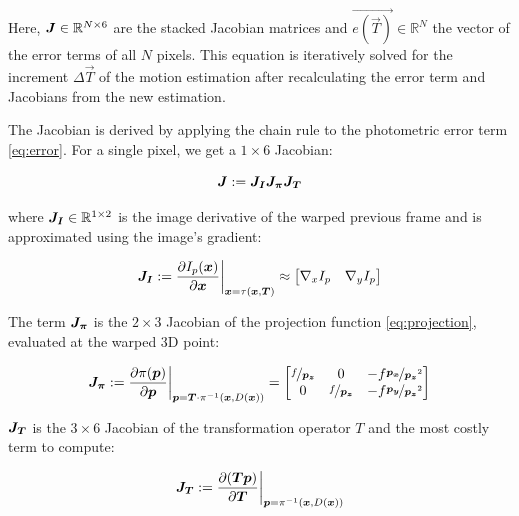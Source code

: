 Here, $\mat{J} \in \mathbb{R}^{N \times 6}$ are the stacked Jacobian matrices
and $\vec{e(\vec{T})} \in \mathbb{R}^N$ the vector of the error terms of all
$N$ pixels.  This equation is iteratively solved for the increment $\Delta
\vec{T}$ of the motion estimation after recalculating the error term and
Jacobians from the new estimation.

The Jacobian is derived by applying the chain rule to the photometric error term \ref{eq:error}.
For a single pixel, we get a $1 \times 6$ Jacobian:

\begin{equation}
    \mat{J} := \mat{J_I} \mat{J_{\pi}} \mat{J_T}
\end{equation}

where $\mat{J_I} \in \mathbb{R}^{1 \times 2}$ is the image derivative of the warped previous frame and is
approximated using the image's gradient:

\begin{equation}
    \mat{J_I} := \frac{\partial I_p(\vec{x})} {\partial \vec{x}} \bigg|_{\vec{x} = \tau(\vec{x}, \vec{T})}
    \approx
    \begin{bmatrix}
        \nabla{}_x I_p & \nabla{}_y I_p
    \end{bmatrix}
\end{equation}

The term $\mat{J_{\pi}}$ is the $2 \times 3$ Jacobian of the projection
function \ref{eq:projection}, evaluated at the warped 3D point:

\begin{equation}
    \mat{J_{\pi}} := \frac{\partial \pi(\vec{p})}{\partial \vec{p}}
    \bigg|_{\vec{p} = \vec{T}\cdot\pi^{-1}(\vec{x},D(\vec{x}))}
    =
    \begin{bmatrix}
        \nicefrac{f}{\vec{p_z}} & 0 & -f \nicefrac{\vec{p_x}}{\vec{p_z}^2} \\
        0 & \nicefrac{f}{\vec{p_z}} & -f \nicefrac{\vec{p_y}}{\vec{p_z}^2}
    \end{bmatrix}
\end{equation}

$\mat{J_T}$ is the $3 \times 6$ Jacobian of the transformation operator $T$ and
the most costly term to compute:

\begin{equation}
    \mat{J_T} := \frac{\partial (\vec{T} \vec{p})}{\partial \vec{T}}
    \bigg|_{\vec{p} = \pi^{-1}(\vec{x}, D(\vec{x}))}
\end{equation}




